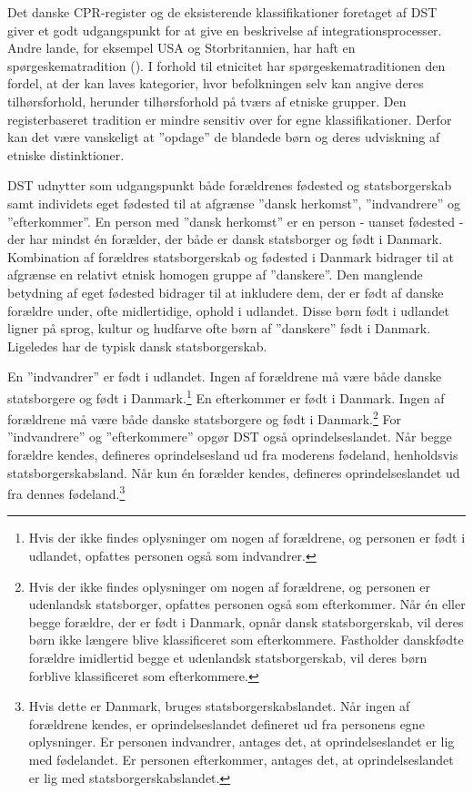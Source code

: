 \documentclass[
]{book}
\begin{document}
Det danske CPR-register og de eksisterende klassifikationer foretaget af DST giver et godt udgangspunkt for at give en beskrivelse af integrationsprocesser. Andre lande, for eksempel USA og Storbritannien, har haft en spørgeskematradition (). I forhold til etnicitet har spørgeskematraditionen den fordel, at der kan laves kategorier, hvor befolkningen selv kan angive deres tilhørsforhold, herunder tilhørsforhold på tværs af etniske grupper. Den registerbaseret tradition er mindre sensitiv over for egne klassifikationer. Derfor kan det være vanskeligt at ''opdage'' de blandede børn og deres udviskning af etniske distinktioner.

DST udnytter som udgangspunkt både forældrenes fødested og statsborgerskab samt individets eget fødested til at afgrænse ''dansk herkomst'', ''indvandrere'' og ''efterkommer''. En person med ''dansk herkomst'' er en person - uanset fødested - der har mindst én forælder, der både er dansk statsborger og født i Danmark. Kombination af forældres statsborgerskab og fødested i Danmark bidrager til at afgrænse en relativt etnisk homogen gruppe af ''danskere''. Den manglende betydning af eget fødested bidrager til at inkludere dem, der er født af danske forældre under, ofte midlertidige, ophold i udlandet. Disse børn født i udlandet ligner på sprog, kultur og hudfarve ofte børn af ''danskere'' født i Danmark. Ligeledes har de typisk dansk statsborgerskab.

En ''indvandrer'' er født i udlandet. Ingen af forældrene må være både danske statsborgere og født i Danmark.\footnote{Hvis der ikke findes oplysninger om nogen af forældrene, og personen er født i udlandet, opfattes personen også som indvandrer.} En efterkommer er født i Danmark. Ingen af forældrene må være både danske statsborgere og født i Danmark.\footnote{Hvis der ikke findes oplysninger om nogen af forældrene, og personen er udenlandsk statsborger, opfattes personen også som efterkommer. Når én eller begge forældre, der er født i Danmark, opnår dansk statsborgerskab, vil deres børn ikke længere blive klassificeret som efterkommere. Fastholder danskfødte forældre imidlertid begge et udenlandsk statsborgerskab, vil deres børn forblive klassificeret som efterkommere.} For ''indvandrere'' og ''efterkommere'' opgør DST også oprindelseslandet. Når begge forældre kendes, defineres oprindelsesland ud fra moderens fødeland, henholdsvis statsborgerskabsland. Når kun én forælder kendes, defineres oprindelseslandet ud fra dennes fødeland.\footnote{Hvis dette er Danmark, bruges statsborgerskabslandet. Når ingen af forældrene kendes, er oprindelseslandet defineret ud fra personens egne oplysninger. Er personen indvandrer, antages det, at oprindelseslandet er lig med fødelandet. Er personen efterkommer, antages det, at oprindelseslandet er lig med statsborgerskabslandet.}
\end{document}
